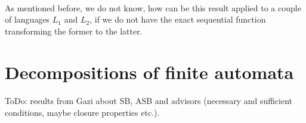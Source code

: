 \paragraph{}
As mentioned before, we do not know, how can be this result applied to a couple of languages $L_{1}$ and $L_{2}$, if we do not have the exact sequential function transforming the former to the latter.

\section{Decompositions of finite automata}

\paragraph{}
ToDo: results from Gazi about SB, ASB and advisors (necessary and sufficient conditions, maybe closure properties etc.).
\paragraph{}
